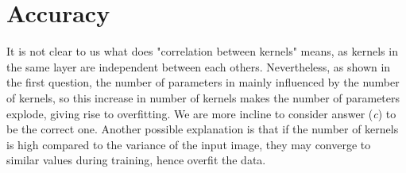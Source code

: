 \documentclass[a4paper]{article}
\begin{document}
\section{Accuracy}
It is not clear to us what does "correlation between kernels" means, as kernels in the same layer are independent between each others. Nevertheless, as shown in the first question, the number of parameters in mainly influenced by the number of kernels, so this increase in number of kernels makes the number of parameters explode, giving rise to overfitting. We are more incline to consider answer (\textit{c}) to be the correct one. Another possible explanation is that if the number of kernels is high compared to the variance of the input image, they may converge to similar values during training, hence overfit the data.

% 
{}

\end{document}
